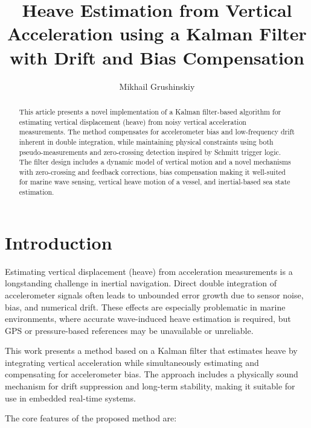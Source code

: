 \documentclass[11pt,letterpaper]{article}
\title{Heave Estimation from Vertical Acceleration using a Kalman Filter with Drift and Bias Compensation}
\author{Mikhail Grushinskiy}
\affil{Independent Researcher, 2025}
\begin{document}
\maketitle

\begin{abstract}
This article presents a novel implementation of a Kalman filter-based algorithm for estimating vertical displacement (heave) from noisy vertical acceleration measurements. The method compensates for accelerometer bias and low-frequency drift inherent in double integration, while maintaining physical constraints using both pseudo-measurements and zero-crossing detection inspired by Schmitt trigger logic. The filter design includes a dynamic model of vertical motion and a novel mechanisms with zero-crossing and feedback corrections, bias compensation making it well-suited for marine wave sensing, vertical heave motion of a vessel, and inertial-based sea state estimation.
\end{abstract}

\section{Introduction}

Estimating vertical displacement (heave) from acceleration measurements is a longstanding challenge in inertial navigation. Direct double integration of accelerometer signals often leads to unbounded error growth due to sensor noise, bias, and numerical drift. These effects are especially problematic in marine environments, where accurate wave-induced heave estimation is required, but GPS or pressure-based references may be unavailable or unreliable.

This work presents a method based on a Kalman filter that estimates heave by integrating vertical acceleration while simultaneously estimating and compensating for accelerometer bias. The approach includes a physically sound mechanism for drift suppression and long-term stability, making it suitable for use in embedded real-time systems.

The core features of the proposed method are:
\end{document}

